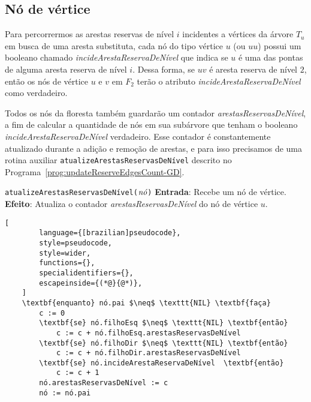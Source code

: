 \subsection{Nó de vértice}
\label{sec:node-vertex}

Para percorrermos as arestas reservas de nível $i$ incidentes a vértices da árvore $T_u$ em busca de uma aresta substituta, cada nó do tipo vértice $u$ (ou $uu$) possui um booleano chamado \textit{incideArestaReservaDeNível} que indica se $u$ é uma das pontas de alguma aresta reserva de nível $i$. Dessa forma, se $uv$ é aresta reserva de nível $2$, então os nós de vértice $u$ e $v$ em $F_2$ terão o atributo \textit{incideArestaReservaDeNível} como verdadeiro. 

Todos os nós da floresta também guardarão um contador \textit{arestasReservasDeNível}, a fim de calcular a quantidade de nós em sua subárvore que tenham o booleano \textit{incideArestaReservaDeNível} verdadeiro. Esse contador é constantemente atualizado durante a adição e remoção de arestas, e para isso precisamos de uma rotina auxiliar \texttt{atualizeArestasReservasDeNível} descrito no Programa~\ref{prog:updateReserveEdgesCount-GD}. 

\begin{programruledcaption}{\texttt{atualizeArestasReservasDeNível($\emph{nó}$)} \label{prog:updateReserveEdgesCount-GD}}
    \noindent\textbf{Entrada}: Recebe um nó de vértice.
    \\
    \noindent\textbf{Efeito}: Atualiza o contador \textit{arestasReservasDeNível} do nó de vértice $u$.
    \vspace{-0.5\baselineskip}
    \begin{lstlisting}[
        language={[brazilian]pseudocode},
        style=pseudocode,
        style=wider,
        functions={},
        specialidentifiers={},
        escapeinside={(*@}{@*)},
    ]
    \textbf{enquanto} nó.pai $\neq$ \texttt{NIL} \textbf{faça}
        c := 0
        \textbf{se} nó.filhoEsq $\neq$ \texttt{NIL} \textbf{então}
            c := c + nó.filhoEsq.arestasReservasDeNível
        \textbf{se} nó.filhoDir $\neq$ \texttt{NIL} \textbf{então}
            c := c + nó.filhoDir.arestasReservasDeNível
        \textbf{se} nó.incideArestaReservaDeNível  \textbf{então}
            c := c + 1
        nó.arestasReservasDeNível := c
        nó := nó.pai
    \end{lstlisting}
    \vspace{-0.5\baselineskip}
\end{programruledcaption}

